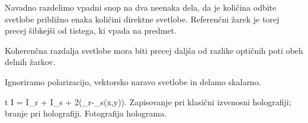 Navadno razdelimo vpadni snop na dva neenaka dela, da je količina odbite svetlobe
približno enaka količini direktne svetlobe. Referenčni žarek je torej precej šibkejši
od tistega, ki vpada na predmet. 

Koherenčna razdalja svetlobe mora biti precej daljša od razlike optičnih poti obeh
delnih žarkov. 

Ignoriramo polarizacijo, vektorsko naravo svetlobe in delamo skalarno. 



\beq
t \propto I = I_r + I_s + 2\cos(\phi_r-\phi_s(x,y)).
\eeq
Zapisovanje pri klasični izvenosni holografiji; branje pri holografiji. 
Fotografija holograma. 
